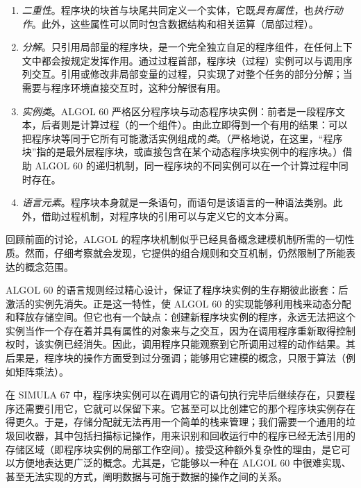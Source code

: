 \begin{enumerate}[wide, nosep, label=(\arabic*)]
	\item \textit{二重性}。程序块的块首与块尾共同定义一个实体，它既\textit{具有属性}，也\textit{执行动作}。此外，这些属性可以同时包含数据结构和相关运算（局部过程）。
	
	\item \textit{分解}。只引用局部量的程序块，是一个完全独立自足的程序组件，在任何上下文中都会按规定发挥作用。通过过程首部，程序块（过程）实例可以与调用序列交互。引用或修改非局部变量的过程，只实现了对整个任务的部分分解；当需要与程序环境直接交互时，这种分解很有用。

	\item \textit{实例类}。ALGOL 60 严格区分程序块与动态程序块实例：前者是一段程序文本，后者则是计算过程（的一个组件）。由此立即得到一个有用的结果：可以把程序块等同于它所有可能激活实例组成的\textit{类}。（严格地说，在这里，“程序块”指的是最外层程序块，或直接包含在某个动态程序块实例中的程序块。）借助 ALGOL 60 的递归机制，同一程序块的不同实例可以在一个计算过程中同时存在。

	\item \textit{语言元素}。程序块本身就是一条语句，而语句是该语言的一种语法类别。此外，借助过程机制，对程序块的引用可以与定义它的文本分离。
\end{enumerate}

回顾前面的讨论，ALGOL 的程序块机制似乎已经具备概念建模机制所需的一切性质。然而，仔细考察就会发现，它提供的组合规则和交互机制，仍然限制了所能表达的概念范围。

ALGOL 60 的语言规则经过精心设计，保证了程序块实例的生存期彼此嵌套：后激活的实例先消失。正是这一特性，使 ALGOL 60 的实现能够利用栈来动态分配和释放存储空间。但它也有一个缺点：创建新程序块实例的程序，永远无法把这个实例当作一个存在着并具有属性的对象来与之交互，因为在调用程序重新取得控制权时，该实例已经消失。因此，调用程序只能观察到它所调用过程的动作结果。其后果是，程序块的操作方面受到过分强调；能够用它建模的概念，只限于算法（例如矩阵乘法）。

在 SIMULA 67 中，程序块实例可以在调用它的语句执行完毕后继续存在，只要程序还需要引用它，它就可以保留下来。它甚至可以比创建它的那个程序块实例存在得更久。于是，存储分配就无法再用一个简单的栈来管理；我们需要一个通用的垃圾回收器，其中包括扫描标记操作，用来识别和回收运行中的程序已经无法引用的存储区域（即程序块实例的局部工作空间）。接受这种额外复杂性的理由，是它可以方便地表达更广泛的概念。尤其是，它能够以一种在 ALGOL 60 中很难实现、甚至无法实现的方式，阐明数据与可施于数据的操作之间的关系。

